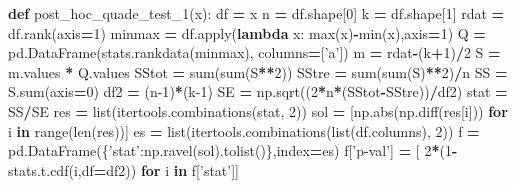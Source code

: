 \documentclass[polish,]{book}
\newenvironment{Shaded}{\begin{snugshade}}{\end{snugshade}}
\newcommand{\BuiltInTok}[1]{#1}
\newcommand{\ControlFlowTok}[1]{\textcolor[rgb]{0.13,0.29,0.53}{\textbf{#1}}}
\newcommand{\DecValTok}[1]{\textcolor[rgb]{0.00,0.00,0.81}{#1}}
\newcommand{\KeywordTok}[1]{\textcolor[rgb]{0.13,0.29,0.53}{\textbf{#1}}}
\newcommand{\NormalTok}[1]{#1}
\newcommand{\OperatorTok}[1]{\textcolor[rgb]{0.81,0.36,0.00}{\textbf{#1}}}
\newcommand{\StringTok}[1]{\textcolor[rgb]{0.31,0.60,0.02}{#1}}
\begin{document}
\begin{Shaded}
\begin{Highlighting}[]
\KeywordTok{def}\NormalTok{ post_hoc_quade_test_1(x):}
\NormalTok{    df }\OperatorTok{=}\NormalTok{ x}
\NormalTok{    n }\OperatorTok{=}\NormalTok{ df.shape[}\DecValTok{0}\NormalTok{]}
\NormalTok{    k }\OperatorTok{=}\NormalTok{ df.shape[}\DecValTok{1}\NormalTok{]}
\NormalTok{    rdat }\OperatorTok{=}\NormalTok{ df.rank(axis}\OperatorTok{=}\DecValTok{1}\NormalTok{)}
\NormalTok{    minmax }\OperatorTok{=}\NormalTok{ df.}\BuiltInTok{apply}\NormalTok{(}\KeywordTok{lambda}\NormalTok{ x: }\BuiltInTok{max}\NormalTok{(x)}\OperatorTok{-}\BuiltInTok{min}\NormalTok{(x),axis}\OperatorTok{=}\DecValTok{1}\NormalTok{)}
\NormalTok{    Q }\OperatorTok{=}\NormalTok{ pd.DataFrame(stats.rankdata(minmax), columns}\OperatorTok{=}\NormalTok{[}\StringTok{'a'}\NormalTok{])}
\NormalTok{    m }\OperatorTok{=}\NormalTok{ rdat}\OperatorTok{-}\NormalTok{(k}\OperatorTok{+}\DecValTok{1}\NormalTok{)}\OperatorTok{/}\DecValTok{2}
\NormalTok{    S }\OperatorTok{=}\NormalTok{ m.values }\OperatorTok{*}\NormalTok{ Q.values}
\NormalTok{    SStot }\OperatorTok{=} \BuiltInTok{sum}\NormalTok{(}\BuiltInTok{sum}\NormalTok{(S}\OperatorTok{**}\DecValTok{2}\NormalTok{))}
\NormalTok{    SStre }\OperatorTok{=} \BuiltInTok{sum}\NormalTok{(}\BuiltInTok{sum}\NormalTok{(S)}\OperatorTok{**}\DecValTok{2}\NormalTok{)}\OperatorTok{/}\NormalTok{n}
\NormalTok{    SS }\OperatorTok{=}\NormalTok{ S.}\BuiltInTok{sum}\NormalTok{(axis}\OperatorTok{=}\DecValTok{0}\NormalTok{)}
\NormalTok{    df2 }\OperatorTok{=}\NormalTok{ (n}\DecValTok{-1}\NormalTok{)}\OperatorTok{*}\NormalTok{(k}\DecValTok{-1}\NormalTok{)}
\NormalTok{    SE }\OperatorTok{=}\NormalTok{ np.sqrt((}\DecValTok{2}\OperatorTok{*}\NormalTok{n}\OperatorTok{*}\NormalTok{(SStot}\OperatorTok{-}\NormalTok{SStre))}\OperatorTok{/}\NormalTok{df2)}
\NormalTok{    stat }\OperatorTok{=}\NormalTok{ SS}\OperatorTok{/}\NormalTok{SE}
\NormalTok{    res }\OperatorTok{=} \BuiltInTok{list}\NormalTok{(itertools.combinations(stat, }\DecValTok{2}\NormalTok{))}
\NormalTok{    sol }\OperatorTok{=}\NormalTok{ [np.}\BuiltInTok{abs}\NormalTok{(np.diff(res[i])) }\ControlFlowTok{for}\NormalTok{ i }\KeywordTok{in} \BuiltInTok{range}\NormalTok{(}\BuiltInTok{len}\NormalTok{(res))]}
\NormalTok{    es }\OperatorTok{=} \BuiltInTok{list}\NormalTok{(itertools.combinations(}\BuiltInTok{list}\NormalTok{(df.columns), }\DecValTok{2}\NormalTok{))}
\NormalTok{    f }\OperatorTok{=}\NormalTok{ pd.DataFrame(\{}\StringTok{'stat'}\NormalTok{:np.ravel(sol).tolist()\},index}\OperatorTok{=}\NormalTok{es)}
\NormalTok{    f[}\StringTok{'p-val'}\NormalTok{] }\OperatorTok{=}\NormalTok{ [ }\DecValTok{2}\OperatorTok{*}\NormalTok{(}\DecValTok{1}\OperatorTok{-}\NormalTok{stats.t.cdf(i,df}\OperatorTok{=}\NormalTok{df2)) }\ControlFlowTok{for}\NormalTok{ i }\KeywordTok{in}\NormalTok{ f[}\StringTok{'stat'}\NormalTok{]]}

\end{Highlighting}
\end{Shaded}
\end{document}

